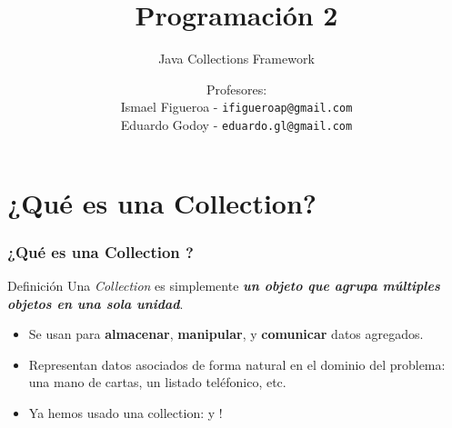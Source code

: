 \documentclass{beamer}
\title[\textbf{Programación 2}]{\textbf{Programación 2}}
\subtitle{Java Collections Framework}
\author[IF-EG]
{Profesores:\\
  Ismael Figueroa -  \texttt{\small ifigueroap@gmail.com} \\
  \vspace{0.5mm}
  Eduardo Godoy - \texttt{\small eduardo.gl@gmail.com}
}
\institute[Universidad de Valparaíso]
\date{}
\begin{document}
\begin{frame}
  \titlepage
\end{frame}


\section{¿Qué es una Collection?}

\begin{frame}
  \frametitle{¿Qué es una Collection ?}

  \begin{block}{Definición}
    Una \emph{Collection} es simplemente \textbf{\textit{un objeto que
        agrupa múltiples objetos en una sola unidad}}.
  \end{block}
    
  \begin{itemize}

  \item Se usan para \textbf{almacenar}, \textbf{manipular}, y
    \textbf{comunicar} datos agregados.
     
  \item Representan datos asociados de forma natural en el dominio del
    problema: una mano de cartas, un listado teléfonico, etc.
    
  \item Ya hemos usado una collection:  y !
    
  \end{itemize}
  
\end{frame}
\end{document}
